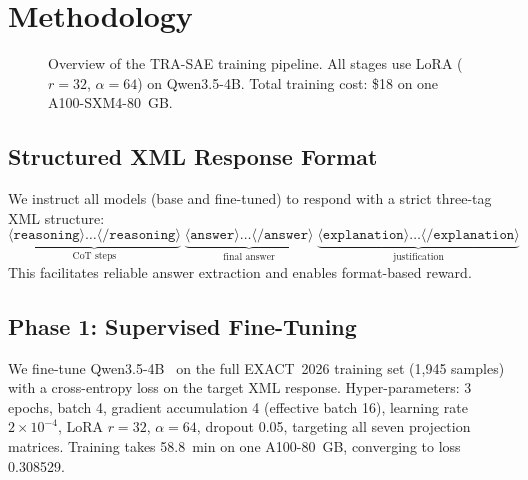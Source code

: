 \documentclass[cmc,journal,article,submit,moreauthors,pdftex]{Definitions/tsp}
\newcommand{\modelname}{\textsc{TRA-SAE}}
\newcommand{\basemodelname}{Qwen3.5-4B}
\newcommand{\dataset}{EXACT~2026}
\begin{document}
\section{Methodology}\label{sec:method}

\begin{figure}[H]
  \centering
  \caption{Overview of the \modelname{} training pipeline. All stages
           use LoRA ($r{=}32$, $\alpha{=}64$) on \basemodelname{}.
           Total training cost: \$18 on one A100-SXM4-80~GB.}
  \label{fig:pipeline}
\end{figure}

\subsection{Structured XML Response Format}

We instruct all models (base and fine-tuned) to respond with a strict
three-tag XML structure:
\begin{equation}
  \underbrace{\langle\texttt{reasoning}\rangle\ldots\langle/\texttt{reasoning}\rangle}_{\text{CoT steps}}
  \;
  \underbrace{\langle\texttt{answer}\rangle\ldots\langle/\texttt{answer}\rangle}_{\text{final answer}}
  \;
  \underbrace{\langle\texttt{explanation}\rangle\ldots\langle/\texttt{explanation}\rangle}_{\text{justification}}
  \tag{3}
\end{equation}
This facilitates reliable answer extraction and enables format-based
reward.

\subsection{Phase 1: Supervised Fine-Tuning}

We fine-tune \basemodelname{}~\cite{Qwen2025} on the full \dataset{}
training set (1,945 samples) with a cross-entropy loss on the target
XML response.
Hyper-parameters: 3 epochs, batch 4, gradient accumulation 4
(effective batch 16), learning rate $2 \times 10^{-4}$, LoRA $r=32$,
$\alpha=64$, dropout 0.05, targeting all seven projection matrices.
Training takes 58.8~min on one A100-80~GB, converging to loss 0.308529.
\end{document}
